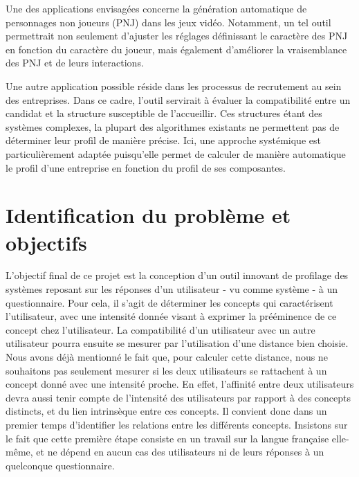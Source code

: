 \documentclass{amsart}
\begin{document}
Une des applications envisagées concerne la génération automatique de personnages non joueurs (PNJ) dans les jeux vidéo. Notamment, un tel outil permettrait non seulement d'ajuster les réglages définissant le caractère des PNJ en fonction du caractère du joueur, mais également d'améliorer la vraisemblance des PNJ et de leurs interactions.

Une autre application possible réside dans les processus de recrutement au sein des entreprises. Dans ce cadre, l'outil servirait à évaluer la compatibilité entre un candidat et la structure susceptible de l'accueillir. Ces structures étant des systèmes complexes, la plupart des algorithmes existants ne permettent pas de déterminer leur profil de manière précise. Ici, une approche systémique est particulièrement adaptée puisqu'elle permet de calculer de manière automatique le profil d'une entreprise en fonction du profil de ses composantes.

\section{Identification du problème et objectifs}\label{sec:Identification du problème et objectifs}
L'objectif final de ce projet est la conception d'un outil innovant de profilage des systèmes reposant sur les réponses d'un utilisateur - vu comme système - à un questionnaire. Pour cela, il s'agit de déterminer les concepts qui caractérisent l'utilisateur, avec une intensité donnée visant à exprimer la prééminence de ce concept chez l'utilisateur. La compatibilité d'un utilisateur avec un autre utilisateur pourra ensuite se mesurer par l'utilisation d'une distance bien choisie. Nous avons déjà mentionné le fait que, pour calculer cette distance, nous ne souhaitons pas seulement mesurer si les deux utilisateurs se rattachent à un concept donné avec une intensité proche. En effet, l'affinité entre deux utilisateurs devra aussi tenir compte de l'intensité des utilisateurs par rapport à des concepts distincts, et du lien intrinsèque entre ces concepts. Il convient donc dans un premier temps d'identifier les relations entre les différents concepts. Insistons sur le fait que cette première étape consiste en un travail sur la langue française elle-même, et ne dépend en aucun cas des utilisateurs ni de leurs réponses à un quelconque questionnaire.
\end{document}
